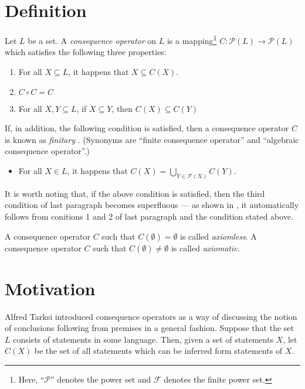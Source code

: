 \documentclass[12pt]{article}
\begin{document}
\section{Definition}

Let $L$ be a set.  A \emph{consequence operator} on $L$ is a
mapping\footnote{Here, ``$\mathcal{P}$'' denotes the power set and 
$\mathcal{F}$ denotes the finite power set.} $C \colon \mathcal{P}(L) \to \mathcal{P}(L)$
which satisfies the following three properties:
\begin{enumerate}
\item For all $X \subseteq L$, it happens that $X \subseteq C(X)$.
\item $C \circ C = C$
\item For all $X, Y \subseteq L$, if $X \subseteq Y$, then $C(X) \subseteq C(Y)$
\end{enumerate}

If, in addition, the following condition is satisfied, then a consequence operator $C$ is known as \emph{finitary }.  (Synonyms are ``finite consequence operator'' and ``algebraic consequence operator''.)
\begin{itemize}
\item For all $X \in L$, it happens that $C(X) = \bigcup\limits_{Y \in \mathcal{F} (X)} C(Y)$.
\end{itemize}
It is worth noting that, if the above condition is satisfied, then the third
condition of last paragraph becomes superfluous --- as shown in 
, it automatically follows 
from conitions 1 and 2 of last paragraph and the condition stated above.

A consequence operator $C$ such that $C(\emptyset) = \emptyset$ is called \emph{axiomless}.  A consequence operator $C$ such that $C(\emptyset) \not= \emptyset$ is called \emph{axiomatic}.

\section{Motivation}

Alfred Tarksi introduced consequence operators as a way of discussing the 
notion of conclusions following from premises in a general fashion.  Suppose
that the set $L$ consists of statements in some language.  Then, given a 
set of statements $X$, let $C(X)$ be the set of all statements which can be
inferred form statements of $X$.
\end{document}
